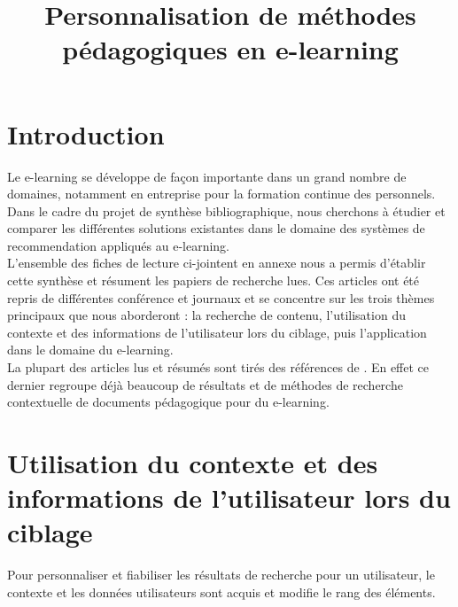 \documentclass[conference]{./sty/IEEEtran}
\begin{document}
\title{Personnalisation de méthodes pédagogiques en e-learning}


\author{
}

\maketitle
\newpage

\tableofcontents
\newpage

\section{Introduction}

Le e-learning se développe de façon importante dans un grand nombre de
domaines, notamment en entreprise pour la formation continue des personnels.
Dans le cadre du projet de synthèse bibliographique, nous cherchons à étudier
et comparer les différentes solutions existantes dans le domaine des systèmes
de recommendation appliqués au e-learning. \\

L'ensemble des fiches de lecture ci-jointent en annexe nous a permis d'établir
cette synthèse et résument les papiers de recherche lues. Ces articles ont été
repris de différentes conférence et journaux et se concentre sur les trois
thèmes principaux que nous aborderont : la recherche de contenu, l'utilisation
du contexte et des informations de l'utilisateur lors du ciblage, puis
l'application dans le domaine du e-learning. \\

La plupart des articles lus et résumés sont tirés des références de
\cite{DBLP:journals/tlt/VerbertMOWDBD12}. En effet ce dernier regroupe déjà
beaucoup de résultats et de méthodes de recherche contextuelle de documents
pédagogique pour du e-learning. \\



\section{Utilisation du contexte et des informations de l'utilisateur lors du ciblage}

Pour personnaliser et fiabiliser les résultats de recherche pour un
utilisateur, le contexte et les données utilisateurs sont acquis et modifie le
rang des éléments. \\
\end{document}
